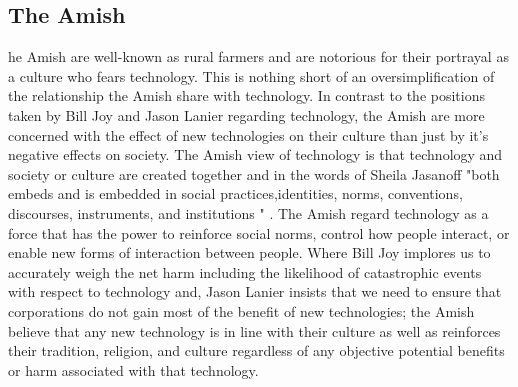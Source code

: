 \subsection{The Amish}
\label{sec:-amish}
he Amish are well-known as rural farmers and are notorious for their portrayal as a culture who fears technology. This is nothing short of an oversimplification of the relationship the Amish share with technology. In contrast to the positions taken by Bill Joy and Jason Lanier regarding technology, the Amish are more concerned with the effect of new technologies on their culture than just by it's negative effects on society. The Amish view of technology is that technology and society or culture are created together and in the words of Sheila Jasanoff "both embeds and is embedded in social practices,identities, norms, conventions, discourses, instruments, and institutions " \cite{wetmore2007amish}. The Amish regard technology as a force that has the power to reinforce social norms, control how people interact, or enable new forms of interaction between people. Where Bill Joy implores us to accurately weigh the net harm including the likelihood of catastrophic events with respect to technology and, Jason Lanier insists that we need to ensure that corporations do not gain most of the benefit of new technologies; the Amish believe that any new technology is in line with their culture as well as reinforces their tradition, religion, and culture regardless of any objective potential benefits or harm associated with that technology. 
